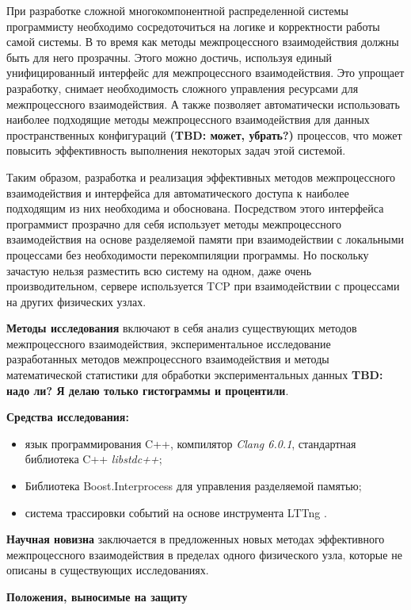 При разработке сложной многокомпонентной распределенной системы программисту необходимо сосредоточиться на логике и корректности работы самой системы. В то время как методы межпроцессного взаимодействия должны быть для него прозрачны. Этого можно достичь, используя единый унифицированный интерфейс для межпроцессного взаимодействия. Это упрощает разработку, снимает необходимость сложного управления ресурсами для межпроцессного взаимодействия. А также позволяет автоматически использовать наиболее подходящие методы межпроцессного взаимодействия для данных пространственных конфигураций 
\textbf{(TBD: может, убрать?)}
процессов, что может повысить эффективность выполнения некоторых задач этой системой.

Таким образом, разработка и реализация эффективных методов межпроцессного взаимодействия и интерфейса для автоматического доступа к наиболее подходящим из них необходима и обоснована. Посредством этого интерфейса программист прозрачно для себя использует методы межпроцессного взаимодействия на основе разделяемой памяти при взаимодействии с локальными процессами без необходимости перекомпиляции программы. Но поскольку зачастую нельзя разместить всю систему на одном, даже очень производительном, сервере используется TCP при взаимодействии с процессами на других физических узлах.

\textbf{Методы исследования} включают в себя анализ существующих методов межпроцессного взаимодействия, экспериментальное исследование разработанных методов межпроцессного взаимодействия и методы математической статистики для обработки экспериментальных данных \textbf{TBD: надо ли? Я делаю только гистограммы и процентили}.

\textbf{Средства исследования:}
\begin{itemize}
\item язык программирования C++, компилятор \textit{Clang 6.0.1}, стандартная библиотека C++ \textit{libstdc++};
\item Библиотека Boost.Interprocess \cite{BoostInterprocess} для управления разделяемой памятью;
\item система трассировки событий \cite{LTTngThesis} на основе инструмента LTTng \cite{LTTngSite}.
\end{itemize}

\textbf{Научная новизна} заключается в предложенных новых методах эффективного межпроцессного взаимодействия в пределах одного физического узла, которые не описаны в существующих исследованиях.

\textbf{Положения, выносимые на защиту}

